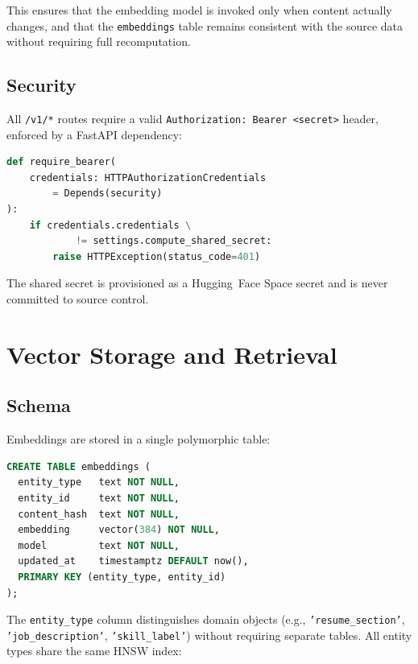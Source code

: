 \documentclass[conference]{IEEEtran}
\begin{document}
This ensures that the embedding model is invoked only when content
actually changes, and that the \texttt{embeddings} table remains
consistent with the source data without requiring full recomputation.

\subsection{Security}

All \texttt{/v1/*} routes require a valid \texttt{Authorization: Bearer <secret>}
header, enforced by a FastAPI dependency:

\begin{lstlisting}[language=Python, caption={Bearer auth dependency.}]
def require_bearer(
    credentials: HTTPAuthorizationCredentials
        = Depends(security)
):
    if credentials.credentials \
            != settings.compute_shared_secret:
        raise HTTPException(status_code=401)
\end{lstlisting}

The shared secret is provisioned as a Hugging~Face Space secret and is
never committed to source control.

\section{Vector Storage and Retrieval}
\label{sec:vector}

\subsection{Schema}

Embeddings are stored in a single polymorphic table:

\begin{lstlisting}[language=SQL, caption={Embeddings table schema.}]
CREATE TABLE embeddings (
  entity_type   text NOT NULL,
  entity_id     text NOT NULL,
  content_hash  text NOT NULL,
  embedding     vector(384) NOT NULL,
  model         text NOT NULL,
  updated_at    timestamptz DEFAULT now(),
  PRIMARY KEY (entity_type, entity_id)
);
\end{lstlisting}

The \texttt{entity\_type} column distinguishes domain objects (e.g.,
\texttt{'resume\_section'}, \texttt{'job\_description'}, \texttt{'skill\_label'})
without requiring separate tables. All entity types share the same HNSW index:
\end{document}
